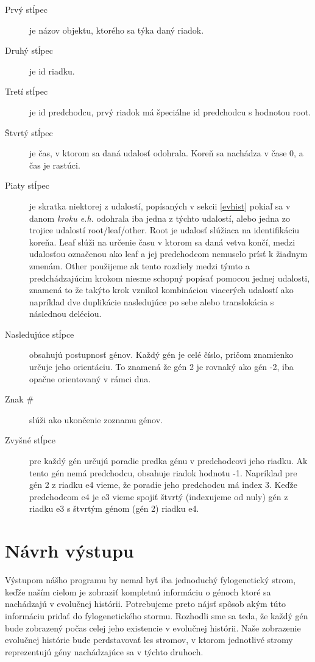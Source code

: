 \begin{description}

\item[Prvý stĺpec] je názov objektu, ktorého sa týka daný riadok.

\item[Druhý stĺpec] je id riadku.

\item[Tretí stĺpec] je id predchodcu, prvý riadok má špeciálne id predchodcu s hodnotou root.

\item[Štvrtý stĺpec] je čas, v ktorom sa daná udalosť odohrala. Koreň sa nachádza v čase 0, a čas je rastúci.

\item[Piaty stĺpec] je skratka niektorej z udalostí, popísaných v sekcii \ref{evhist} pokiaľ sa v danom \emph{kroku e.h.} odohrala iba jedna z týchto udalostí, alebo jedna zo trojice udalostí root/leaf/other.
Root je udalosť slúžiaca na identifikáciu koreňa.
Leaf slúži na určenie času v ktorom sa daná vetva končí, medzi udalosťou označenou ako leaf a jej predchodcom nemuselo prísť k žiadnym zmenám.
Other použijeme ak tento rozdiely medzi týmto a predchádzajúcim krokom niesme schopný popísať pomocou jednej udalosti,
znamená to že takýto krok vznikol kombináciou viacerých udalostí ako napríklad dve duplikácie nasledujúce po sebe alebo translokácia s následnou deléciou.

\item [Nasledujúce stĺpce] obsahujú postupnosť génov. Každý gén je celé číslo, pričom znamienko určuje jeho orientáciu. To znamená že gén 2 je rovnaký ako gén -2, iba opačne orientovaný v rámci dna.

\item [Znak \#] slúži ako ukončenie zoznamu génov.

\item[Zvyšné stĺpce] pre každý gén určujú poradie predka génu v predchodcovi jeho riadku. Ak tento gén nemá predchodcu, obsahuje riadok hodnotu -1.
Napríklad pre gén 2 z riadku e4 vieme, že poradie jeho predchodcu má index 3. Keďže predchodcom e4 je e3 vieme spojiť štvrtý (indexujeme od nuly) gén z riadku e3 s štvrtým génom (gén 2) riadku e4.

\end{description}

\section{Návrh výstupu}
\label{sec:vykreslene}
Výstupom nášho programu by nemal byť iba jednoduchý fylogenetický strom, keďže naším cielom je zobraziť 
kompletnú informáciu o génoch ktoré sa nachádzajú v evolučnej histórii.
Potrebujeme preto nájsť spôsob akým túto informáciu pridať do fylogenetického stormu.
Rozhodli sme sa teda, že každý gén bude zobrazený počas celej jeho existencie v evolučnej histórii. Naše zobrazenie evolučnej histórie bude perdstavovať
les stromov, v ktorom jednotlivé stromy reprezentujú gény nachádzajúce sa v týchto druhoch. 

